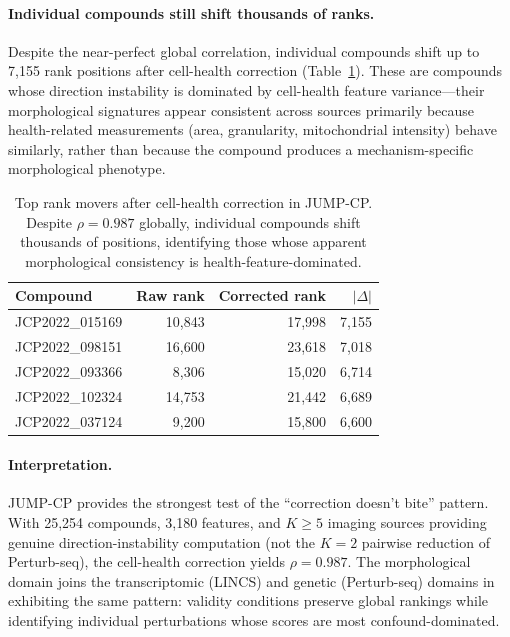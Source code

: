 \documentclass{article}
\begin{document}
\paragraph{Individual compounds still shift thousands of ranks.}
Despite the near-perfect global correlation, individual compounds shift up
to 7{,}155 rank positions after cell-health correction
(Table~\ref{tab:jump_movers}). These are compounds whose direction
instability is dominated by cell-health feature variance---their
morphological signatures appear consistent across sources primarily because
health-related measurements (area, granularity, mitochondrial intensity)
behave similarly, rather than because the compound produces a
mechanism-specific morphological phenotype.

\begin{table}[t]
\centering
\caption{Top rank movers after cell-health correction in JUMP-CP. Despite
$\rho = 0.987$ globally, individual compounds shift thousands of positions,
identifying those whose apparent morphological consistency is
health-feature-dominated.}
\label{tab:jump_movers}
\small
\begin{tabular}{lrrr}
\toprule
Compound & Raw rank & Corrected rank & $|\Delta|$ \\
\midrule
JCP2022\_015169 & 10{,}843 & 17{,}998 & 7{,}155 \\
JCP2022\_098151 & 16{,}600 & 23{,}618 & 7{,}018 \\
JCP2022\_093366 & 8{,}306 & 15{,}020 & 6{,}714 \\
JCP2022\_102324 & 14{,}753 & 21{,}442 & 6{,}689 \\
JCP2022\_037124 & 9{,}200 & 15{,}800 & 6{,}600 \\
\bottomrule
\end{tabular}
\end{table}

\paragraph{Interpretation.}
JUMP-CP provides the strongest test of the ``correction doesn't bite''
pattern. With 25{,}254 compounds, 3{,}180 features, and $K \geq 5$ imaging
sources providing genuine direction-instability computation (not the $K = 2$
pairwise reduction of Perturb-seq), the cell-health correction yields $\rho
= 0.987$. The morphological domain joins the transcriptomic (LINCS) and
genetic (Perturb-seq) domains in exhibiting the same pattern: validity
conditions preserve global rankings while identifying individual
perturbations whose scores are most confound-dominated.
\end{document}
